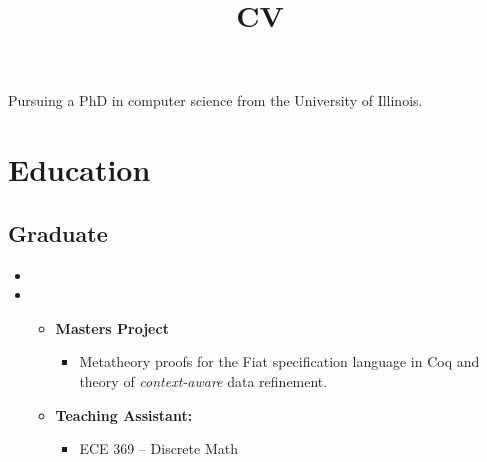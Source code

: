 \documentclass[10pt,a4paper,sans]{moderncv}        %
\title{CV}                               %
\begin{document}
\makecvtitle

\small{ Pursuing a PhD in computer science from the University of Illinois. }

\section{Education}

\vspace{3pt}

\subsection{Graduate}

\vspace{3pt}

\begin{itemize}

\item{}

\item{}

  \begin{itemize}
  \item{
      \textbf{Masters Project}
      \begin{itemize}
      \item \parbox{0.75\linewidth}{Metatheory proofs for the Fiat
          specification language in Coq and theory of
          \emph{context-aware} data refinement. }
      \end{itemize}
    }
  \item{\textbf{Teaching Assistant:}}
    \begin{itemize}
    \item ECE 369 -- Discrete Math
    \end{itemize}
  \end{itemize}





\end{itemize}
\end{document}
